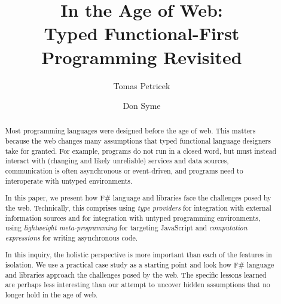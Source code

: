 \documentclass[submission,copyright,creativecommons]{eptcs}
\title{In the Age of Web:\\
  \textnormal{\LARGE Typed Functional-First Programming Revisited}}
\author{Tomas Petricek
\institute{University of Cambridge, UK}
\email{tomas@tomasp.net}
\and
Don Syme
\institute{Microsoft Research Cambridge, UK}
\email{don.syme@microsoft.com}
}
\begin{document}
\maketitle


\begin{abstract}
Most programming languages were designed before the age of web.
This matters because the web changes many assumptions that typed functional language designers take 
for granted. For example, programs do not run in a closed word, but must instead interact with 
(changing and likely unreliable) services and data sources, communication is often asynchronous 
or event-driven, and programs need to interoperate with untyped environments.

In this paper, we present how F\# language and libraries face the challenges posed by the web.
Technically, this comprises using \emph{type providers} for integration with external information 
sources and for integration with untyped programming environments, using \emph{lightweight 
meta-programming} for targeting JavaScript and \emph{computation expressions} for writing 
asynchronous code.

In this inquiry, the holistic perspective is more important than each of the features in isolation.
We use a practical case study as a starting point and look how F\# language and libraries approach 
the challenges posed by the web. The specific lessons learned are perhaps less interesting than 
our attempt to uncover hidden assumptions that no longer hold in the age of web.
\end{abstract}

                                                     

%
%                                                    
\end{document}
